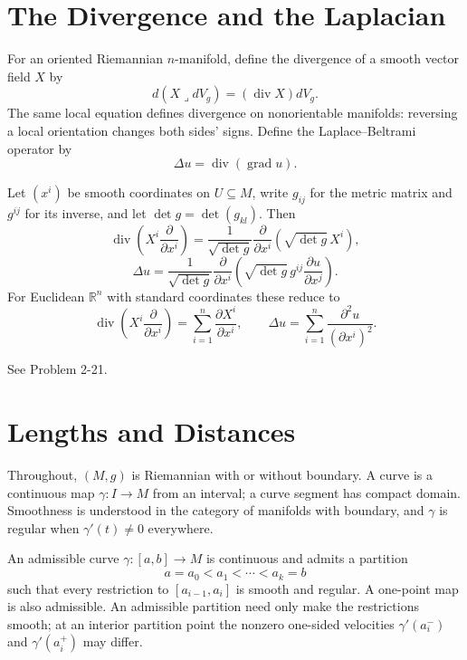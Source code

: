 \section{The Divergence and the Laplacian}

For an oriented Riemannian $n$-manifold, define the divergence of a smooth vector field $X$ by
\begin{equation}
d(X\lrcorner dV_g)=(\operatorname{div}X)dV_g. \tag{2.19}
\end{equation}
The same local equation defines divergence on nonorientable manifolds: reversing a local orientation changes both sides' signs. Define the Laplace--Beltrami operator by
\begin{equation}
\Delta u=\operatorname{div}(\operatorname{grad}u). \tag{2.20}
\end{equation}

\begin{proposition}
\label{prop:coordinate-representations-divergence-laplacian}
Let $(x^i)$ be smooth coordinates on $U\subseteq M$, write $g_{ij}$ for the metric matrix and $g^{ij}$ for its inverse, and let $\det g=\det(g_{kl})$. Then
\[
\operatorname{div}\left(X^i\frac{\partial}{\partial x^i}\right)=\frac{1}{\sqrt{\det g}}\frac{\partial}{\partial x^i}\left(\sqrt{\det g}\,X^i\right),
\]
\[
\Delta u=\frac{1}{\sqrt{\det g}}\frac{\partial}{\partial x^i}\left(\sqrt{\det g}\,g^{ij}\frac{\partial u}{\partial x^j}\right).
\]
For Euclidean $\mathbb R^n$ with standard coordinates these reduce to
\[
\operatorname{div}\left(X^i\frac{\partial}{\partial x^i}\right)=\sum_{i=1}^n\frac{\partial X^i}{\partial x^i},
\qquad
\Delta u=\sum_{i=1}^n\frac{\partial^2u}{(\partial x^i)^2}.
\]
\end{proposition}

\sketch See Problem 2-21.
\section{Lengths and Distances}

Throughout, $(M,g)$ is Riemannian with or without boundary. A curve is a continuous map $\gamma:I\to M$ from an interval; a curve segment has compact domain. Smoothness is understood in the category of manifolds with boundary, and $\gamma$ is regular when $\gamma'(t)\ne0$ everywhere.

An admissible curve $\gamma:[a,b]\to M$ is continuous and admits a partition
\[
a=a_0<a_1<\cdots<a_k=b
\]
such that every restriction to $[a_{i-1},a_i]$ is smooth and regular. A one-point map is also admissible. An admissible partition need only make the restrictions smooth; at an interior partition point the nonzero one-sided velocities $\gamma'(a_i^-)$ and $\gamma'(a_i^+)$ may differ.

